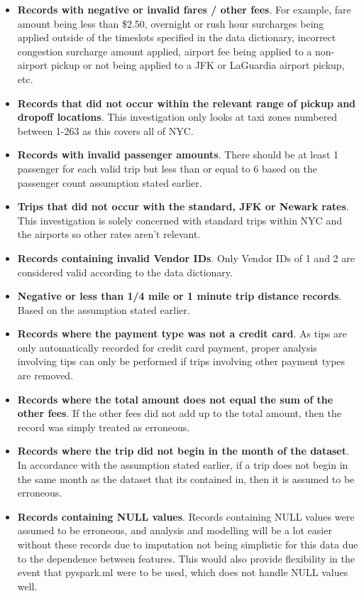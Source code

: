 \documentclass[11pt]{article}
\begin{document}
\begin{itemize} 
    \item \textbf{Records with negative or invalid fares / other fees}. For example, fare amount being less than \$2.50, overnight or rush hour surcharges being applied outside of the timeslots specified in the data dictionary, incorrect congestion surcharge amount applied, airport fee being applied to a non-airport pickup or not being applied to a JFK or LaGuardia  airport pickup, etc.
    \item \textbf{Records that did not occur within the relevant range of pickup and dropoff locations}. This investigation only looks at taxi zones numbered between 1-263 as this covers all of NYC.
    \item \textbf{Records with invalid passenger amounts}. There should be at least 1 passenger for each valid trip but less than or equal to 6 based on the passenger count assumption stated earlier.
    \item \textbf{Trips that did not occur with the standard, JFK or Newark rates}. This investigation is solely concerned with standard trips within NYC and the airports so other rates aren't relevant.
    \item \textbf{Records containing invalid Vendor IDs}. Only Vendor IDs of 1 and 2 are considered valid according to the data dictionary.
    \item \textbf{Negative or less than 1/4 mile or 1 minute trip distance records}. Based on the assumption stated earlier.
    \item \textbf{Records where the payment type was not a credit card}. As tips are only automatically recorded for credit card payment, proper analysis involving tips can only be performed if trips involving other payment types are removed.
    \item \textbf{Records where the total amount does not equal the sum of the other fees}. If the other fees did not add up to the total amount, then the record was simply treated as erroneous.
    \item \textbf{Records where the trip did not begin in the month of the dataset}. In accordance with the assumption stated earlier, if a trip does not begin in the same month as the dataset that its contained in, then it is assumed to be erroneous.
    \item \textbf{Records containing NULL values}. Records containing NULL values were assumed to be erroneous, and analysis and modelling will be a lot easier without these records due to imputation not being simplistic for this data due to the dependence between features. This would also provide flexibility in the event that pyspark.ml were to be used, which does not handle NULL values well.
\end{itemize} 
\end{document}
